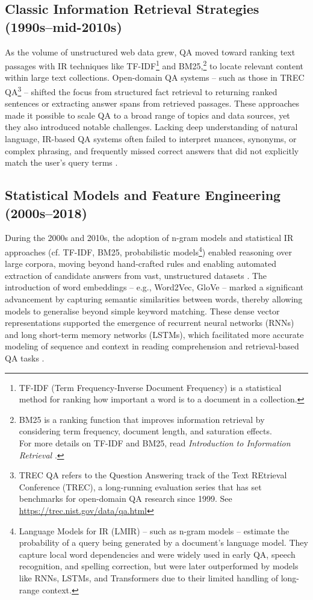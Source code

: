 \begin{spacing}{1.5}
\subsection{Classic Information Retrieval Strategies (1990s--mid-2010s)}
As the volume of unstructured web data grew, QA moved toward ranking text passages with IR techniques like TF-IDF\footnote{TF-IDF (Term Frequency-Inverse Document Frequency) is a statistical method for ranking how important a word is to a document in a collection.} and BM25,\footnote{BM25 is a ranking function that improves information retrieval by considering term frequency, document length, and saturation effects.\\For more details on TF-IDF and BM25, read \textit{Introduction to Information Retrieval} \citep{manning_introduction_2008}.} to locate relevant content within large text collections. Open-domain QA systems -- such as those in TREC QA\footnote{TREC QA refers to the Question Answering track of the Text REtrieval Conference (TREC), a long-running evaluation series that has set benchmarks for open-domain QA research since 1999. See \url{https://trec.nist.gov/data/qa.html}} \citep{hirschman_natural_2001} -- shifted the focus from structured fact retrieval to returning ranked sentences or extracting answer spans from retrieved passages. These approaches made it possible to scale QA to a broad range of topics and data sources, yet they also introduced notable challenges. Lacking deep understanding of natural language, IR-based QA systems often failed to interpret nuances, synonyms, or complex phrasing, and frequently missed correct answers that did not explicitly match the user’s query terms \citep{antoniou_survey_2022, caballero_brief_2021}.

\subsection{Statistical Models and Feature Engineering (2000s--2018)}
During the 2000s and 2010s, the adoption of n-gram models and statistical IR approaches (cf. TF-IDF, BM25, probabilistic models\footnote{Language Models for IR (LMIR) -- such as n-gram models -- estimate the probability of a query being generated by a document's language model. They capture local word dependencies and were widely used in early QA, speech recognition, and spelling correction, \citep{ponte_language_1998} but were later outperformed by models like RNNs, LSTMs, and Transformers due to their limited handling of long-range context.}) enabled reasoning over large corpora, moving beyond hand-crafted rules and enabling automated extraction of candidate answers from vast, unstructured datasets \citep{manning_introduction_2008}. The introduction of word embeddings -- e.g., Word2Vec, GloVe -- marked a significant advancement by capturing semantic similarities between words, thereby allowing models to generalise beyond simple keyword matching. These dense vector representations supported the emergence of recurrent neural networks (RNNs) and long short-term memory networks (LSTMs), which facilitated more accurate modeling of sequence and context in reading comprehension and retrieval-based QA tasks \citep{jurafsky_chapter_2024}. 


\end{spacing}

